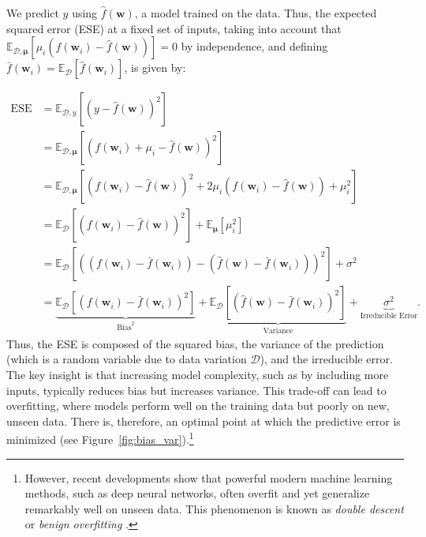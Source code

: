 We predict \( y \) using \( \hat{f}(\mathbf{w}) \), a model trained on the data. Thus, the expected squared error (ESE) at a fixed set of inputs, taking into account that \( \mathbb{E}_{\mathcal{D},\boldsymbol{\mu}} \left[\mu_i(f(\mathbf{w}_i) - \hat{f}(\mathbf{w}))\right] = 0 \) by independence, and defining \( \bar{f}(\mathbf{w}_i) = \mathbb{E}_{\mathcal{D}}[\hat{f}(\mathbf{w}_i)] \), is given by:

\begin{align*}
	\text{ESE} &= \mathbb{E}_{\mathcal{D},y} \left[ (y - \hat{f}(\mathbf{w}))^2 \right] \\
	&= \mathbb{E}_{\mathcal{D},\boldsymbol{\mu}} \left[ \left(f(\mathbf{w}_i) + \mu_i - \hat{f}(\mathbf{w})\right)^2 \right] \\
	&= \mathbb{E}_{\mathcal{D},\boldsymbol{\mu}} \left[ (f(\mathbf{w}_i) - \hat{f}(\mathbf{w}))^2 + 2\mu_i(f(\mathbf{w}_i) - \hat{f}(\mathbf{w})) + \mu_i^2 \right] \\
	&= \mathbb{E}_{\mathcal{D}} \left[ (f(\mathbf{w}_i) - \hat{f}(\mathbf{w}))^2 \right] + \mathbb{E}_{\boldsymbol{\mu}} \left[ \mu_i^2 \right] \\
	&= \mathbb{E}_{\mathcal{D}} \left[ \left((f(\mathbf{w}_i) - \bar{f}(\mathbf{w}_i)) - (\hat{f}(\mathbf{w}) - \bar{f}(\mathbf{w}_i)) \right)^2 \right] + \sigma^2 \\
	&= \underbrace{\mathbb{E}_{\mathcal{D}} \left[ (f(\mathbf{w}_i) - \bar{f}(\mathbf{w}_i))^2 \right]}_{\text{Bias}^2} + \underbrace{\mathbb{E}_{\mathcal{D}} \left[ (\hat{f}(\mathbf{w}) - \bar{f}(\mathbf{w}_i))^2 \right]}_{\text{Variance}} + \underbrace{\sigma^2}_{\text{Irreducible Error}}.
\end{align*}
Thus, the ESE is composed of the squared bias, the variance of the prediction (which is a random variable due to data variation $\mathcal{D}$), and the irreducible error. The key insight is that increasing model complexity, such as by including more inputs, typically reduces bias but increases variance. This trade-off can lead to overfitting, where models perform well on the training data but poorly on new, unseen data. There is, therefore, an optimal point at which the predictive error is minimized (see Figure~\ref{fig:bias_var}).\footnote{However, recent developments show that powerful modern machine learning methods, such as deep neural networks, often overfit and yet generalize remarkably well on unseen data. This phenomenon is known as \textit{double descent} or \textit{benign overfitting} \cite{belkin2019reconciling, bartlett2020benign, hastie2022surprises}.}

